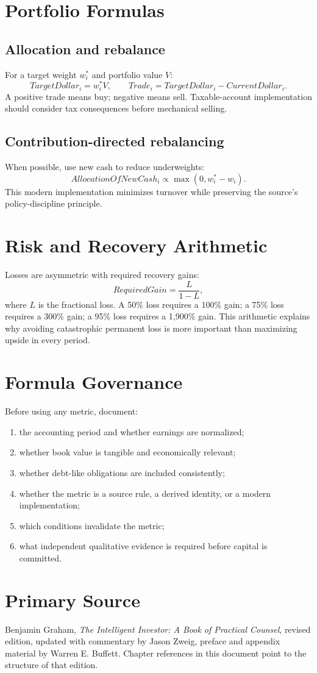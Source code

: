 \documentclass[11pt]{article}
\begin{document}
\section{Portfolio Formulas}
\subsection{Allocation and rebalance}
For a target weight $w_i^*$ and portfolio value $V$:
\begin{equation}
TargetDollar_i=w_i^*V, \qquad Trade_i=TargetDollar_i-CurrentDollar_i.
\end{equation}
A positive trade means buy; negative means sell. Taxable-account implementation should consider tax consequences before mechanical selling.

\subsection{Contribution-directed rebalancing}
When possible, use new cash to reduce underweights:
\begin{equation}
AllocationOfNewCash_i \propto \max(0,w_i^*-w_i).
\end{equation}
This modern implementation minimizes turnover while preserving the source's policy-discipline principle.

\section{Risk and Recovery Arithmetic}
Losses are asymmetric with required recovery gains:
\begin{equation}
RequiredGain=\frac{L}{1-L},
\end{equation}
where $L$ is the fractional loss. A 50\% loss requires a 100\% gain; a 75\% loss requires a 300\% gain; a 95\% loss requires a 1,900\% gain. This arithmetic explains why avoiding catastrophic permanent loss is more important than maximizing upside in every period.

\section{Formula Governance}
Before using any metric, document:
\begin{enumerate}
\item the accounting period and whether earnings are normalized;
\item whether book value is tangible and economically relevant;
\item whether debt-like obligations are included consistently;
\item whether the metric is a source rule, a derived identity, or a modern implementation;
\item which conditions invalidate the metric;
\item what independent qualitative evidence is required before capital is committed.
\end{enumerate}

\section*{Primary Source}
Benjamin Graham, \textit{The Intelligent Investor: A Book of Practical Counsel}, revised edition, updated with commentary by Jason Zweig, preface and appendix material by Warren E. Buffett. Chapter references in this document point to the structure of that edition.
\end{document}
